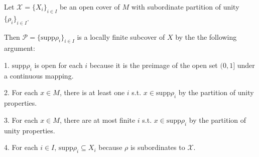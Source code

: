 Let $\mathcal{X} = \{X_i\}_{i \in I}$ be an open cover of $M$ with subordinate partition of unity $\{\rho_i\}_{i \in I}$.  

Then $\mathcal{P} = \{\textrm{supp}\rho_i\}_{i \in I}$ is a locally finite subcover of $X$ by the the following argument:

1. $\textrm{supp} \rho_i$ is open for each $i$ because it is the preimage of the open set $(0, 1]$ under a continuous mapping.

2. For each $x \in M$, there is at least one $i$ s.t. $x \in \textrm{supp} \rho_i$ by the partition of unity properties.

3. For each $x \in M$, there are at most finite $i$ s.t. $x \in \textrm{supp} \rho_i$ by the partition of unity properties.

4. For each $i \in I$, $\textrm{supp}\rho_i \subseteq X_i$ because $\rho$ is subordinates to $\mathcal{X}$.
